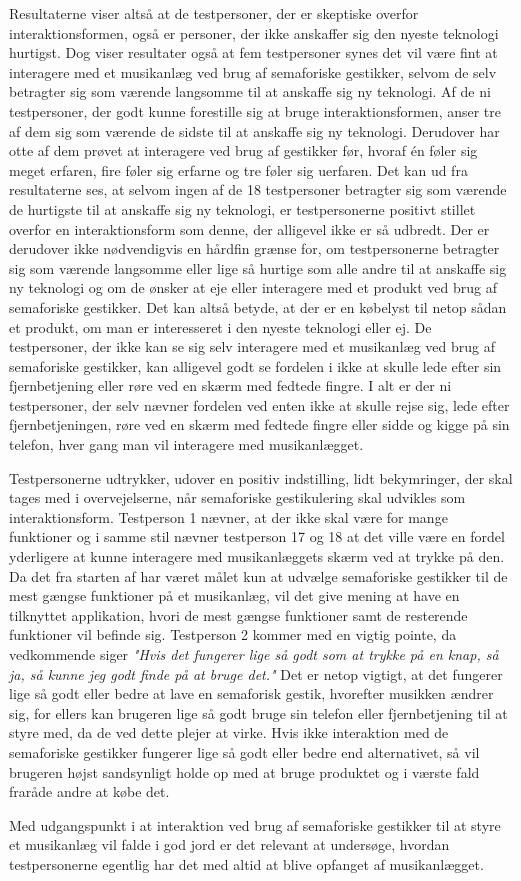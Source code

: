 Resultaterne viser altså at de testpersoner, der er skeptiske overfor interaktionsformen, også er personer, der ikke anskaffer sig den nyeste teknologi hurtigst. Dog viser resultater også at fem testpersoner synes det vil være fint at interagere med et musikanlæg ved brug af semaforiske gestikker, selvom de selv betragter sig som værende langsomme til at anskaffe sig ny teknologi. Af de ni testpersoner, der godt kunne forestille sig at bruge interaktionsformen, anser tre af dem sig som værende de sidste til at anskaffe sig ny teknologi. Derudover har otte af dem prøvet at interagere ved brug af gestikker før, hvoraf én føler sig meget erfaren, fire føler sig erfarne og tre føler sig uerfaren. Det kan ud fra resultaterne ses, at selvom ingen af de 18 testpersoner betragter sig som værende de hurtigste til at anskaffe sig ny teknologi, er testpersonerne positivt stillet overfor en interaktionsform som denne, der alligevel ikke er så udbredt. Der er derudover ikke nødvendigvis en hårdfin grænse for, om testpersonerne betragter sig som værende langsomme eller lige så hurtige som alle andre til at anskaffe sig ny teknologi og om de ønsker at eje eller interagere med et produkt ved brug af semaforiske gestikker. Det kan altså betyde, at der er en købelyst til netop sådan et produkt, om man er interesseret i den nyeste teknologi eller ej. De testpersoner, der ikke kan se sig selv interagere med et musikanlæg ved brug af semaforiske gestikker, kan alligevel godt se fordelen i ikke at skulle lede efter sin fjernbetjening eller røre ved en skærm med fedtede fingre. I alt er der ni testpersoner, der selv nævner fordelen ved enten ikke at skulle rejse sig, lede efter fjernbetjeningen, røre ved en skærm med fedtede fingre eller sidde og kigge på sin telefon, hver gang man vil interagere med musikanlægget. \blankline
 
Testpersonerne udtrykker, udover en positiv indstilling, lidt bekymringer, der skal tages med i overvejelserne, når semaforiske gestikulering skal udvikles som interaktionsform. Testperson 1 nævner, at der ikke skal være for mange funktioner og i samme stil nævner testperson 17 og 18 at det ville være en fordel yderligere at kunne interagere med musikanlæggets skærm ved at trykke på den. Da det fra starten af har været målet kun at udvælge semaforiske gestikker til de mest gængse funktioner på et musikanlæg, vil det give mening at have en tilknyttet applikation, hvori de mest gængse funktioner samt de resterende funktioner vil befinde sig. Testperson 2 kommer med en vigtig pointe, da vedkommende siger \textsl{"Hvis det fungerer lige så godt som at trykke på en knap, så ja, så kunne jeg godt finde på at bruge det."} Det er netop vigtigt, at det fungerer lige så godt eller bedre at lave en semaforisk gestik, hvorefter musikken ændrer sig, for ellers kan brugeren lige så godt bruge sin telefon eller fjernbetjening til at styre med, da de ved dette plejer at virke. Hvis ikke interaktion med de semaforiske gestikker fungerer lige så godt eller bedre end alternativet, så vil brugeren højst sandsynligt holde op med at bruge produktet og i værste fald fraråde andre at købe det.

Med udgangspunkt i at interaktion ved brug af semaforiske gestikker til at styre et musikanlæg vil falde i god jord er det relevant at undersøge, hvordan testpersonerne egentlig har det med altid at blive opfanget af musikanlægget.

